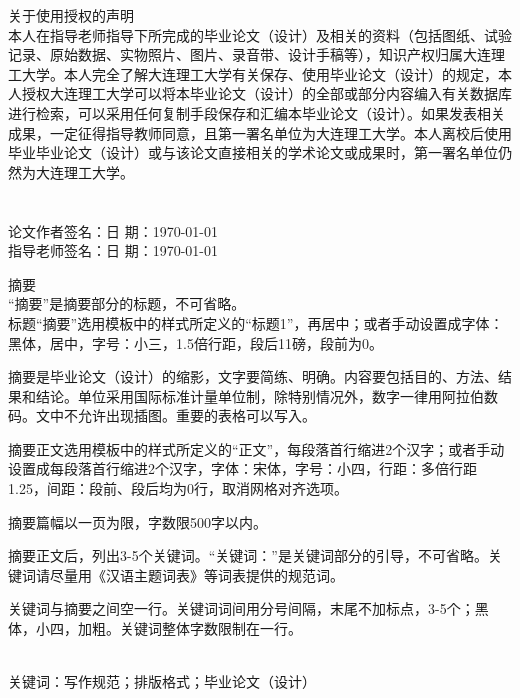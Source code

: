 \documentclass{ctexart}%
\newcommand{\heitibf}{\CJKfamily{heitibf}}
\newcommand{\huawenxiheibf}{\CJKfamily{hwxhbf}}
\newenvironment{abstract1}[0]{}{}%
{}
\begin{document}
	\huawenxiheibf {} \center \linespread{1.5} 关于使用授权的声明 \\ 
	\vspace{11pt}
	\songti {} \justifying  \linespread{1.25} 本人在指导老师指导下所完成的毕业论文（设计）及相关的资料（包括图纸、试验记录、原始数据、实物照片、图片、录音带、设计手稿等），知识产权归属大连理工大学。本人完全了解大连理工大学有关保存、使用毕业论文（设计）的规定，本人授权大连理工大学可以将本毕业论文（设计）的全部或部分内容编入有关数据库进行检索，可以采用任何复制手段保存和汇编本毕业论文（设计）。如果发表相关成果，一定征得指导教师同意，且第一署名单位为大连理工大学。本人离校后使用毕业毕业论文（设计）或与该论文直接相关的学术论文或成果时，第一署名单位仍然为大连理工大学。\\
	~\\
	~\\
	论文作者签名：\qquad \qquad \qquad  \qquad \qquad   日  期：\today    \\
	指导老师签名：\qquad \qquad \qquad  \qquad \qquad   日  期：\today    \\
	\clearpage
	
	\begin{abstract1}
	\heiti {} \linespread{1.5} \center 摘\qquad 要\\ 	\vspace{11pt}
	\setlength{\parindent}{24pt}
	\songti {} \justifying \linespread{1.25} “摘要”是摘要部分的标题，不可省略。\\
	标题“摘要”选用模板中的样式所定义的“标题1”，再居中；或者手动设置成字体：黑体，居中，字号：小三，1.5倍行距，段后11磅，段前为0。\par 
	摘要是毕业论文（设计）的缩影，文字要简练、明确。内容要包括目的、方法、结果和结论。单位采用国际标准计量单位制，除特别情况外，数字一律用阿拉伯数码。文中不允许出现插图。重要的表格可以写入。\par 
	摘要正文选用模板中的样式所定义的“正文”，每段落首行缩进2个汉字；或者手动设置成每段落首行缩进2个汉字，字体：宋体，字号：小四，行距：多倍行距 1.25，间距：段前、段后均为0行，取消网格对齐选项。\par 
	摘要篇幅以一页为限，字数限500字以内。\par 
	摘要正文后，列出3-5个关键词。“关键词：”是关键词部分的引导，不可省略。关键词请尽量用《汉语主题词表》等词表提供的规范词。\par 
	关键词与摘要之间空一行。关键词词间用分号间隔，末尾不加标点，3-5个；黑体，小四，加粗。关键词整体字数限制在一行。\par
	~\\
	\heitibf {} \justifying 关键词：写作规范；排版格式；毕业论文（设计）
	\end{abstract1}
	\clearpage
	
\end{document}
